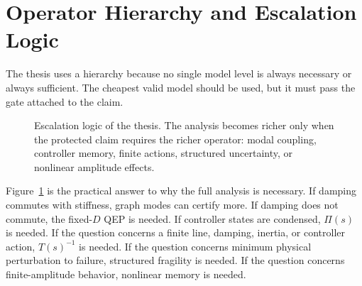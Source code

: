 \section{Operator Hierarchy and Escalation Logic}

The thesis uses a hierarchy because no single model level is always necessary
or always sufficient. The cheapest valid model should be used, but it must pass
the gate attached to the claim.

\begin{figure}[ht]
\centering
{}
\caption{Escalation logic of the thesis. The analysis becomes richer only
when the protected claim requires the richer operator: modal coupling,
controller memory, finite actions, structured uncertainty, or nonlinear
amplitude effects.}
\label{fig:framework_escalation}
\end{figure}

Figure~\ref{fig:framework_escalation} is the practical answer to why the full
analysis is necessary. If damping commutes with stiffness, graph modes can
certify more. If damping does not commute, the fixed-\(D\) QEP is needed. If
controller states are condensed, \(\Pi(s)\) is needed. If the question concerns
a finite line, damping, inertia, or controller action, \(T(s)^{-1}\) is needed.
If the question concerns minimum physical perturbation to failure, structured
fragility is needed. If the question concerns finite-amplitude behavior,
nonlinear memory is needed.

